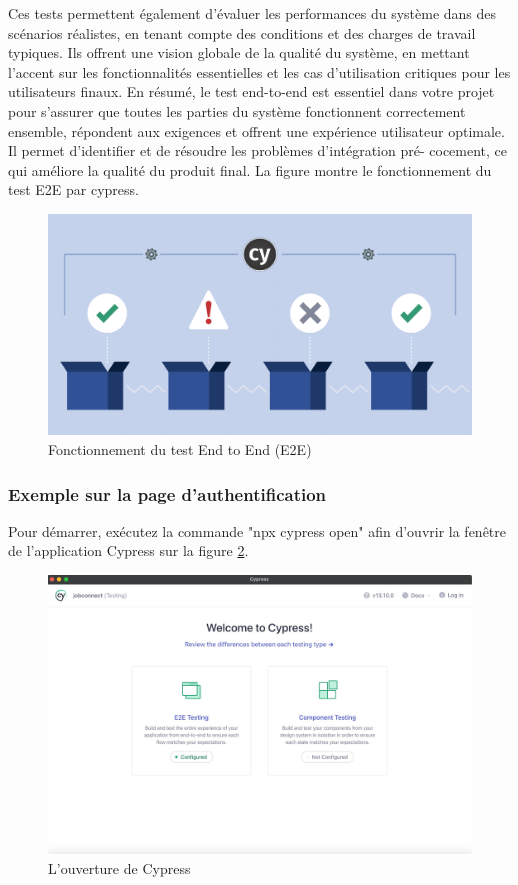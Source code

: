 Ces tests permettent également d’évaluer  les  performances  du  système dans des scénarios réalistes, en tenant compte des conditions et des charges de travail typiques. Ils offrent une vision globale de la  qualité  du  système,  en mettant l’accent sur les fonctionnalités essentielles et les  cas  d’utilisation critiques pour les utilisateurs finaux. En résumé, le test end-to-end est essentiel dans votre projet pour s’assurer que toutes les parties du système fonctionnent correctement ensemble, répondent aux exigences et offrent une expérience utilisateur optimale. Il permet d’identifier et de résoudre les problèmes d’intégration pré- cocement, ce qui améliore la  qualité  du  produit  final.  La figure montre le fonctionnement du test E2E par cypress.
\begin{figure}[htbp]
   \centering
   \includegraphics[scale=0.2]{cypress/1.png} 
   \caption{Fonctionnement du test End to End (E2E)}
   \label{fig:listOffers}
\end{figure}



\subsubsection{Exemple sur la page d’authentification}
Pour démarrer, exécutez la commande "npx cypress open" afin d'ouvrir la fenêtre de l'application Cypress sur la figure \ref{fig:cy1}.
\newline

\begin{figure}[htbp]
   \centering
   \includegraphics[scale=0.2]{cypress/2.jpg} 
   \caption{L'ouverture de Cypress}
   \label{fig:cy1}
\end{figure}

